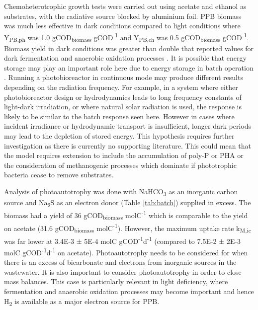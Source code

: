 Chemoheterotrophic growth tests were carried out using acetate and ethanol as substrates, with the radiative source blocked by aluminium foil. PPB biomass was much less effective in dark conditions compared to light conditions where Y\textsubscript{PB,ph} was 1.0 gCOD\textsubscript{biomass} gCOD\textsuperscript{-1} and Y\textsubscript{PB,ch} was 0.5 gCOD\textsubscript{biomass} gCOD\textsuperscript{-1}. Biomass yield in dark conditions was greater than double that reported values for dark fermentation and anaerobic oxidation processes \cite{Batstone2002}. It is possible that energy storage may play an important role here due to energy storage in batch operation \cite{Liang2010}. Running a photobioreactor in continuous mode may produce different results depending on the radiation frequency. For example, in a system where either photobioreactor design or hydrodynamics leads to long frequency constants of light-dark irradiation, or where natural solar radiation is used, the response is likely to be similar to the batch response seen here. However in cases where incident irradiance or hydrodynamic transport is insufficient, longer dark periods may lead to the depletion of stored energy. This hypothesis requires further investigation as there is currently no supporting literature. This could mean that the model requires extension to include the accumulation of poly-P or PHA or the consideration of methanogenic processes which dominate if phototrophic bacteria cease to remove substrates.

Analysis of photoautotrophy was done with NaHCO\textsubscript{3} as an inorganic carbon source and Na\textsubscript{2}S as an electron donor (Table \ref{tab:batch}) supplied in excess. The biomass had a yield of 36 gCOD\textsubscript{biomass} molC\textsuperscript{-1} which is comparable to the yield on acetate (31.6 gCOD\textsubscript{biomass} molC\textsuperscript{-1}). However, the maximum uptake rate k\textsubscript{M,ic} was far lower at \num{3.4E-3} $\pm$ \num{5E-4} molC gCOD\textsuperscript{-1}d\textsuperscript{-1} (compared to \num{7.5E-2} $\pm$ \num{2E-3} molC gCOD\textsuperscript{-1}d\textsuperscript{-1} on acetate). Photoautotrophy needs to be considered for when there is an excess of bicarbonate and electrons from inorganic sources in the wastewater. It is also important to consider photoautotrophy in order to close mass balances. This case is particularly relevant in light deficiency, where fermentation and anaerobic oxidation processes may become important and hence H\textsubscript{2} is available as a major electron source for PPB.

